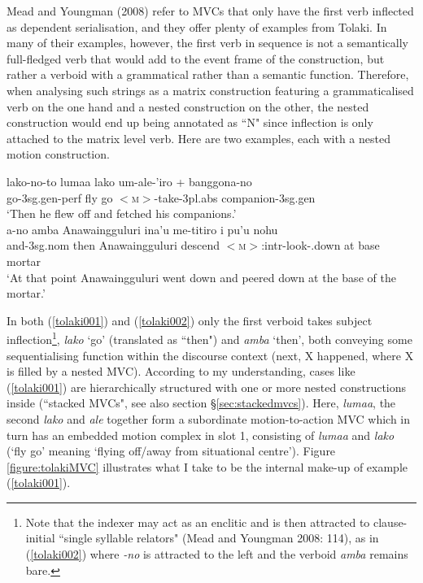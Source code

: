 Mead and Youngman (2008) refer to MVCs that only have the first verb inflected as dependent serialisation, and they offer plenty of examples from Tolaki. In many of their examples, however, the first verb in sequence is not a semantically full-fledged verb that would add to the event frame of the construction, but rather a verboid with a grammatical rather than a semantic function. Therefore, when analysing such strings as a matrix construction featuring a grammaticalised verb on the one hand and a nested construction on the other, the nested construction would end up being annotated as ``N" since inflection is only attached to the matrix level verb. Here are two examples, each with a nested motion construction.

\ea \label{tolaki001}
\gll lako-no-to lumaa lako um-ale-'iro + banggona-no \\
go-3\acs{sg}.\acs{gen}-\acs{perf} fly go $<$\textsc{m}$>$-take-3\acs{pl}.\acs{abs} companion-3\acs{sg}.\acs{gen} \\
\glft `Then he flew off and fetched his companions.' \\ 
\z
\xe
\ea \label{tolaki002}
\gll a-no amba Anawaingguluri ina'u me-titiro i pu'u nohu \\
and-3\acs{sg}.\acs{nom} then Anawaingguluri descend $<$\textsc{m}$>$:\acs{intr}-look-.down at base mortar \\
\glft `At that point Anawaingguluri went down and peered down at the base of the mortar.' \\ 
\z
\xe

In both (\ref{tolaki001}) and (\ref{tolaki002}) only the first verboid takes subject inflection\footnote{Note that the indexer may act as an enclitic and is then attracted to clause-initial ``single syllable relators" (Mead and Youngman 2008: 114), as in (\ref{tolaki002}) where \textit{-no} is attracted to the left and the verboid \textit{amba} remains bare.}, \textit{lako} `go' (translated as ``then") and \textit{amba} `then', both conveying some sequentialising function within the discourse context (next, X happened, where X is filled by a nested MVC). According to my understanding, cases like (\ref{tolaki001}) are hierarchically structured with one or more nested constructions inside (``stacked MVCs", see also section §\ref{sec:stackedmvcs}). Here, \textit{lumaa}, the second \textit{lako} and \textit{ale} together form a subordinate motion-to-action MVC which in turn has an embedded motion complex in slot 1, consisting of \textit{lumaa} and \textit{lako} (`fly go' meaning `flying off/away from situational centre'). Figure \ref{figure:tolakiMVC} illustrates what I take to be the internal make-up of example (\ref{tolaki001}).

